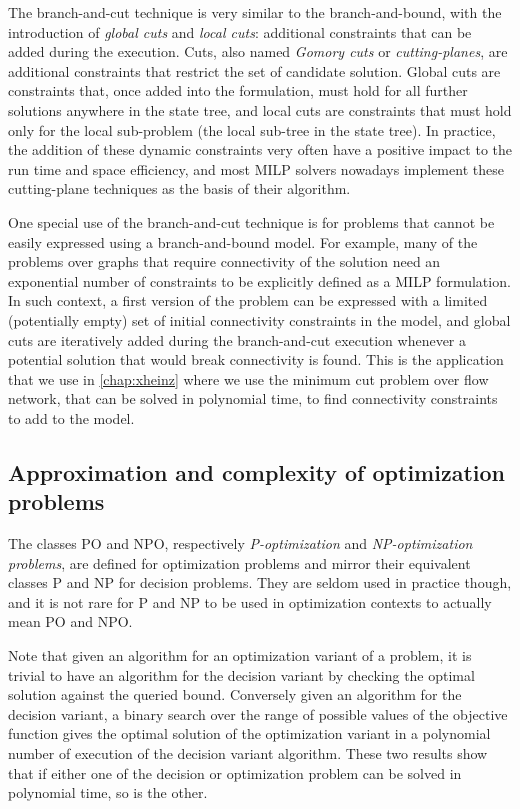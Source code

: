 			The branch-and-cut technique is very similar to the branch-and-bound, with the introduction of \emph{global cuts} and \emph{local cuts}: additional constraints that can be added during the execution.
			Cuts, also named \emph{Gomory cuts} \parencite{gononri1958outline} or \emph{cutting-planes}, are additional constraints that restrict the set of candidate solution. %
			Global cuts are constraints that, once added into the formulation, must hold for all further solutions anywhere in the state tree, and local cuts are constraints that must hold only for the local sub-problem (the local sub-tree in the state tree).
			In practice, the addition of these dynamic constraints very often have a positive impact to the run time and space efficiency, and most MILP solvers nowadays implement these cutting-plane techniques as the basis of their algorithm.

			One special use of the branch-and-cut technique is for problems that cannot be easily expressed using a branch-and-bound model.
			For example, many of the problems over graphs that require connectivity of the solution need an exponential number of constraints to be explicitly defined as a MILP formulation.
			In such context, a first version of the problem can be expressed with a limited (potentially empty) set of initial connectivity constraints in the model, and global cuts are iteratively added during the branch-and-cut execution whenever a potential solution that would break connectivity is found.
			This is the application that we use in \cref{chap:xheinz} where we use the minimum cut problem over flow network, that can be solved in polynomial time, %
				to find connectivity constraints to add to the model.

	\subsection{Approximation and complexity of optimization problems}
	\label{subsec:optcomplex}
		The classes PO and NPO, respectively \emph{P-optimization} and \emph{NP-optimization problems}, are defined for optimization problems and mirror their equivalent classes P and NP for decision problems.
		They are seldom used in practice though, and it is not rare for P and NP to be used in optimization contexts to actually mean PO and NPO.

		Note that given an algorithm for an optimization variant of a problem, it is trivial to have an algorithm for the decision variant by checking the optimal solution against the queried bound.
		Conversely given an algorithm for the decision variant, a binary search over the range of possible values of the objective function gives the optimal solution of the optimization variant in a polynomial number of execution of the decision variant algorithm.
		These two results show that if either one of the decision or optimization problem can be solved in polynomial time, so is the other.


